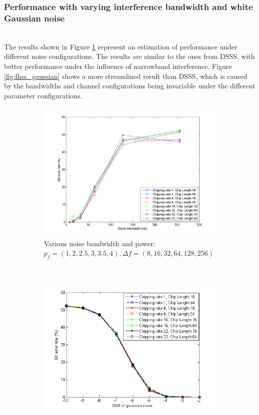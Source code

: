 			
		\subsubsection{Performance with varying interference bandwidth and white Gaussian noise}~\\
			The results shown in Figure \ref{fig:fhss_bandwidth} represent an estimation of performance under different noise configurations.
			The results are similar to the ones from DSSS, with better performance under the influence of narrowband interference.
			Figure \ref{fig:fhss_gaussian} shows a more streamlined result than DSSS, which is caused by the bandwidths and channel configurations being invariable under the different parameter configurations.
	
			\begin{figure}[H]
				\centering
				\begin{subfigure}[b]{0.5\textwidth}
					\includegraphics[width=\textwidth]{imgs/results/plot_mode_fhss-test_bandwidthAndPower-rep_20-dataRate_8-dataLength_128.png}
					\caption{Various noise bandwidth and power: $p_f = (1,2,2.5,3,3.5,4), \Delta f = (8,16,32,64,128,256)$}
					\label{fig:fhss_bandwidth}
				\end{subfigure}%
				~
				\begin{subfigure}[b]{0.5\textwidth}
					\includegraphics[width=\textwidth]{imgs/results/plot_mode_fhss-test_gaussianSNR-rep_20-dataRate_8-dataLength_128_fixedlegend.png}

\end{subfigure}
\end{figure}
